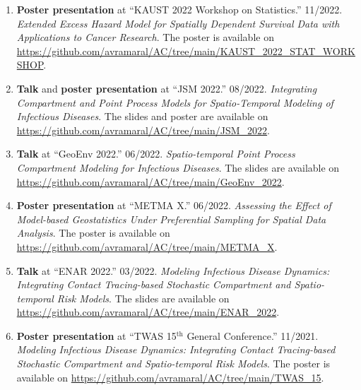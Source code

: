 \documentclass[11pt, ]{article}
\begin{document}
	\begin{enumerate}
		\item \textbf{Poster presentation} at ``KAUST 2022 Workshop on Statistics.'' 11/2022. \textit{Extended Excess Hazard Model for Spatially Dependent Survival Data with Applications to Cancer Research}. The poster is available on \href{https://github.com/avramaral/AC/tree/main/KAUST_2022_STAT_WORKSHOP}{\url{https://github.com/avramaral/AC/tree/main/KAUST_2022_STAT_WORKSHOP}}.
		
		\item \textbf{Talk} and \textbf{poster presentation} at ``JSM 2022.'' 08/2022. \textit{Integrating Compartment and Point Process Models for Spatio-Temporal Modeling of Infectious Diseases}. The slides and poster are available on \href{https://github.com/avramaral/AC/tree/main/JSM\_2022}{\url{https://github.com/avramaral/AC/tree/main/JSM\_2022}}.
		
		\item \textbf{Talk} at ``GeoEnv 2022.'' 06/2022. \textit{Spatio-temporal Point Process Compartment Modeling for Infectious Diseases}. The slides are available on \href{https://github.com/avramaral/AC/tree/main/GeoEnv\_2022}{\url{https://github.com/avramaral/AC/tree/main/GeoEnv\_2022}}.
		
		\item \textbf{Poster presentation} at ``METMA X.'' 06/2022. \textit{Assessing the Effect of Model-based Geostatistics Under Preferential Sampling for Spatial Data Analysis}. The poster is available on \href{https://github.com/avramaral/AC/tree/main/METMA\_X}{\url{https://github.com/avramaral/AC/tree/main/METMA\_X}}.
		
		\item \textbf{Talk} at ``ENAR 2022.'' 03/2022. \textit{Modeling Infectious Disease Dynamics: Integrating Contact Tracing-based	Stochastic Compartment and Spatio-temporal Risk Models}. The slides are available on \href{https://github.com/avramaral/AC/tree/main/ENAR\_2022}{\url{https://github.com/avramaral/AC/tree/main/ENAR\_2022}}.
		
		\item \textbf{Poster presentation} at ``TWAS 15${}^{\text{th}}$ General Conference.'' 11/2021. \textit{Modeling Infectious Disease Dynamics: Integrating Contact Tracing-based	Stochastic Compartment and Spatio-temporal Risk Models}. The poster is available on \href{https://github.com/avramaral/AC/tree/main/TWAS\_15}{\url{https://github.com/avramaral/AC/tree/main/TWAS\_15}}.
	\end{enumerate}
\end{document}

